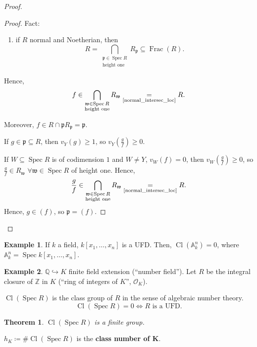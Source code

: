\documentclass[12pt]{article}
\DeclareMathOperator{\Spec}{Spec}
\DeclareMathOperator{\Frac}{Frac}
\DeclareMathOperator{\Cl}{Cl}
\newtheorem*{theorem}{Theorem}
\theoremstyle{definition}
\newtheorem*{example}{Example}
\theoremstyle{remark}
\begin{document}
\begin{proof}
\begin{itemize}
\begin{proof}
Fact:
\begin{enumerate}[resume,label=(\roman*)]
\item\label{normal_intersec_loc} if $R$ normal and Noetherian, then
\[R=\bigcap_{\substack{\mathfrak{p}\in\Spec R\\\text{height one}}}R_{\mathfrak{p}}\subseteq\Frac(R).\]
\end{enumerate}

Hence,
\[f\in\bigcap_{\substack{\mathfrak{w}\in\Spec R\\\text{height one}}}R_{\mathfrak{w}}\underset{\text{\ref{normal_intersec_loc}}}{=}R.\]

Moreover, $f\in R\cap\mathfrak{p}R_{\mathfrak{p}}=\mathfrak{p}$.

If $g\in\mathfrak{p}\subseteq R$, then $v_Y(g)\geq1$, so $v_Y(\frac{g}{f})\geq0$.

If $W\subseteq\Spec R$ is of codimension $1$ and $W\neq Y$, $v_W(f)=0$, then $v_W(\frac{g}{f})\geq0$, so $\frac{g}{f}\in R_{\mathfrak{w}}$ $\forall\mathfrak{w}\in\Spec R$ of height one. Hence,
\[\frac{g}{f}\in\bigcap_{\substack{\mathfrak{w}\in\Spec R\\\text{height one}}}R_{\mathfrak{w}}\underset{\text{\ref{normal_intersec_loc}}}{=}R.\]
Hence, $g\in(f)$, so $\mathfrak{p}=(f)$.
\end{proof}
\end{itemize}
\end{proof}

\begin{example}
If $k$ a field, $k[x_1,\ldots,x_n]$ is a UFD. Then, $\Cl(\mathbb{A}_k^n)=0$, where $\mathbb{A}_k^n=\Spec k[x_1,\ldots,x_n]$.
\end{example}

\begin{example}
$\mathbb{Q}\hookrightarrow K$ finite field extension (``number field''). Let $R$ be the integral closure of $\mathbb{Z}$ in $K$ (``ring of integers of $K$'', $\mathcal{O}_K$).

$\Cl(\Spec R)$ is the class group of $R$ in the sense of algebraic number theory.
\[\Cl(\Spec R)=0\Longleftrightarrow R\text{ is a UFD}.\]

\begin{theorem}
$\Cl(\Spec R)$ is a finite group.
\end{theorem}

$h_K\coloneqq\#\Cl(\Spec R)$ is the \textbf{class number of $\boldsymbol{K}$}.
\end{example}
\end{document}
